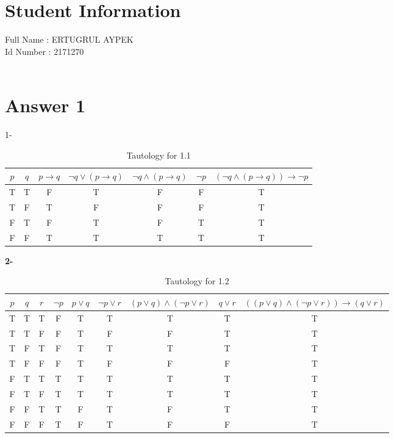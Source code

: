 \documentclass[12pt]{article}
\begin{document}
\section*{Student Information } 
Full Name : ERTUGRUL AYPEK \\
Id Number : 2171270 \\
\\
\section*{Answer 1}
1-

\begin{table}[H]
	\centering
	\caption{Tautology for 1.1}
	\begin{tabular}{|c|c|c|c|c|c|c|}
	\hline
	\textbf{$p$} & \textbf{$q$} & \textbf{$p \rightarrow q$} & \textbf{$\neg q \vee(p \rightarrow q)$} & \textbf{$\neg q \wedge(p \rightarrow q)$} & \textbf{$\neg p$} & \textbf{$(\neg q \wedge (p \rightarrow q)) \rightarrow \neg p$} \\
	\hline
	T & T & F & T & F & F & T  \\ \hline
	T & F & T & F & F & F & T \\ \hline
	F & T & F & T & F & T & T \\ \hline
	F & F & T & T & T & T & T \\ 
	\hline
	
	\end{tabular}
	
\end{table}


\begin{flushleft}
\textbf{2-}
\end{flushleft}

\begin{table}[H]
	\centering
	\caption{Tautology for 1.2}
	\begin{tabular}{|c|c|c|c|c|c|c|c|c|}
	\hline
	\textbf{$p$} & \textbf{$q$} & \textbf{$r$} & \textbf{$\neg p$} & \textbf{$p \vee q$} & \textbf{$\neg p \vee r$} & \textbf{$(p \vee q) \wedge ( \neg p \vee r)$} & \textbf{$q \vee r$} & \textbf{$((p \vee q) \wedge ( \neg p \vee r)) \rightarrow (q \vee r)$}	\\
	\hline
	T & T & T & F & T & T & T & T & T \\ \hline
	T & T & F & F & T & F & F & T & T \\ \hline 
	T & F & T & F & T & T & T & T & T \\ \hline 
	T & F & F & F & T & F & F & F & T \\ \hline
	F & T & T & T & T & T & T & T & T \\ \hline
	F & T & F & T & T & T & T & T & T \\ \hline
	F & F & T & T & F & T & F & T & T \\ \hline
	F & F & F & T & F & T & F & F & T \\
	\hline
	
	
	
	
	\end{tabular}
\end{table}
\end{document}
